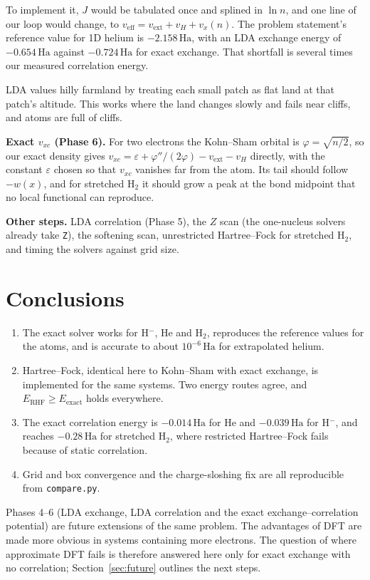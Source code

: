 \documentclass[11pt,a4paper]{article}
\newcommand{\Ha}{\ensuremath{\,\mathrm{Ha}}}
\begin{document}
To implement it, $J$ would be tabulated once and splined in $\ln n$, and one line of our loop would change, to
$v_\text{eff}=v_\text{ext}+v_H+v_x(n)$. The problem statement's reference value for 1D helium is $-2.158$\Ha, with an LDA
exchange energy of $-0.654$\Ha{} against $-0.724$\Ha{} for exact exchange. That shortfall is several times our measured
correlation energy.

\begin{plainwords}
LDA values hilly farmland by treating each small patch as flat land at that patch's altitude. This works where
the land changes slowly and fails near cliffs, and atoms are full of cliffs.
\end{plainwords}

\textbf{Exact $v_{xc}$ (Phase 6).} For two electrons the Kohn--Sham orbital is $\varphi=\sqrt{n/2}$, so our exact density gives
$v_{xc}=\varepsilon+\varphi''/(2\varphi)-v_\text{ext}-v_H$ directly, with the constant $\varepsilon$ chosen so that $v_{xc}$ vanishes far from
the atom. Its tail should follow $-w(x)$, and for stretched H$_2$ it should grow a peak at the bond midpoint that no
local functional can reproduce.

\textbf{Other steps.} LDA correlation (Phase 5), the $Z$ scan (the one-nucleus solvers already take \texttt{Z}), the
softening scan, unrestricted Hartree--Fock for stretched H$_2$, and timing the solvers against grid size.

\section{Conclusions}

\begin{enumerate}
  \item The exact solver works for H$^-$, He and H$_2$, reproduces the reference values for the atoms, and is
        accurate to about $10^{-6}$\Ha{} for extrapolated helium.
  \item Hartree--Fock, identical here to Kohn--Sham with exact exchange, is implemented for the same systems.
        Two energy routes agree, and $E_\text{RHF}\ge E_\text{exact}$ holds everywhere.
  \item The exact correlation energy is $-0.014$\Ha{} for He and $-0.039$\Ha{} for H$^-$, and reaches $-0.28$\Ha{} for
        stretched H$_2$, where restricted Hartree--Fock fails because of static correlation.
  \item Grid and box convergence and the charge-sloshing fix are all reproducible from \texttt{compare.py}.
\end{enumerate}
Phases 4--6 (LDA exchange, LDA correlation and the exact exchange--correlation potential) are future extensions
of the same problem. The advantages of DFT are made more obvious in systems containing more electrons.
The question of where approximate DFT fails is therefore answered here only for exact
exchange with no correlation; Section~\ref{sec:future} outlines the next steps.
\end{document}
